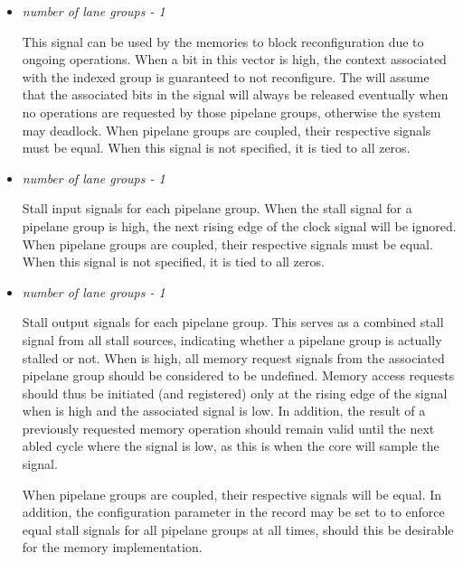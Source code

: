 \begin{itemize}
\vspace{1em}
\item {}\textit{number of lane groups - 1}

This signal can be used by the memories to block reconfiguration due to ongoing 
operations. When a bit in this vector is high, the context associated with the 
indexed group is guaranteed to not reconfigure. The \rvex{} will assume that the 
associated bits in the  signal will always be 
released eventually when no operations are requested by those pipelane groups, 
otherwise the system may deadlock. When pipelane groups are coupled, their 
respective  signals must be equal. When this 
signal is not specified, it is tied to all zeros.

\vspace{1em}
\item {}\textit{number of lane groups - 1}

Stall input signals for each pipelane group. When the stall signal for a 
pipelane group is high, the next rising edge of the clock signal will be 
ignored. When pipelane groups are coupled, their respective 
 signals must be equal. When this signal is not specified, 
it is tied to all zeros.

\vspace{1em}
\item {}\textit{number of lane groups - 1}

Stall output signals for each pipelane group. This serves as a combined stall 
signal from all stall sources, indicating whether a pipelane group is actually 
stalled or not. When  is high, all memory request signals 
from the associated pipelane group should be considered to be undefined. Memory 
access requests should thus be initiated (and registered) only at the rising 
edge of the  signal when  is high and the associated 
 signal is low. In addition, the result of a previously
requested memory operation should remain valid until the next abled
cycle where the  signal is low, as this is when the core
will sample the signal.

When pipelane groups are coupled, their respective  
signals will be equal. In addition, the  configuration 
parameter in the  record may be set to  to enforce equal 
stall signals for all pipelane groups at all times, should this be desirable for 
the memory implementation.


\end{itemize}
